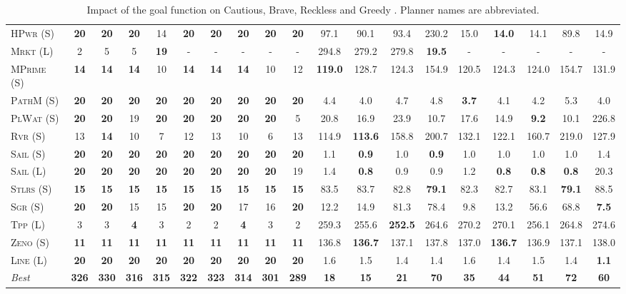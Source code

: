 \begin{table}[tb]
{\begin{tabular}{|l||ccccccccc||ccccccccc||}
\textsc{HPwr} (S)&\textbf{20}&\textbf{20}&\textbf{20}&14&\textbf{20}&\textbf{20}&\textbf{20}&\textbf{20}&\textbf{20}&97.1&90.1&93.4&230.2&15.0&\textbf{14.0}&14.1&89.8&14.9\\
\textsc{Mrkt} (L)&2&5&5&\textbf{19}&-&-&-&-&-&294.8&279.2&279.8&\textbf{19.5}&-&-&-&-&-\\
\textsc{MPrime} (S)&\textbf{14}&\textbf{14}&\textbf{14}&10&\textbf{14}&\textbf{14}&\textbf{14}&10&12&\textbf{119.0}&128.7&124.3&154.9&120.5&124.3&124.0&154.7&131.9\\
\textsc{PathM} (S)&\textbf{20}&\textbf{20}&\textbf{20}&\textbf{20}&\textbf{20}&\textbf{20}&\textbf{20}&\textbf{20}&\textbf{20}&4.4&4.0&4.7&4.8&\textbf{3.7}&4.1&4.2&5.3&4.0\\
\textsc{PlWat} (S)&\textbf{20}&\textbf{20}&19&\textbf{20}&\textbf{20}&\textbf{20}&\textbf{20}&\textbf{20}&5&20.8&16.9&23.9&10.7&17.6&14.9&\textbf{9.2}&10.1&226.8\\
\textsc{Rvr} (S)&13&\textbf{14}&10&7&12&13&10&6&13&114.9&\textbf{113.6}&158.8&200.7&132.1&122.1&160.7&219.0&127.9\\
\textsc{Sail} (S)&\textbf{20}&\textbf{20}&\textbf{20}&\textbf{20}&\textbf{20}&\textbf{20}&\textbf{20}&\textbf{20}&\textbf{20}&1.1&\textbf{0.9}&1.0&\textbf{0.9}&1.0&1.0&1.0&1.0&1.4\\
\textsc{Sail} (L)&\textbf{20}&\textbf{20}&\textbf{20}&\textbf{20}&\textbf{20}&\textbf{20}&\textbf{20}&\textbf{20}&19&1.4&\textbf{0.8}&0.9&0.9&1.2&\textbf{0.8}&\textbf{0.8}&\textbf{0.8}&20.3\\
\textsc{Stlrs} (S)&\textbf{15}&\textbf{15}&\textbf{15}&\textbf{15}&\textbf{15}&\textbf{15}&\textbf{15}&\textbf{15}&\textbf{15}&83.5&83.7&82.8&\textbf{79.1}&82.3&82.7&83.1&\textbf{79.1}&88.5\\
\textsc{Sgr} (S)&\textbf{20}&\textbf{20}&15&15&\textbf{20}&\textbf{20}&17&16&\textbf{20}&12.2&14.9&81.3&78.4&9.8&13.2&56.6&68.8&\textbf{7.5}\\
\textsc{Tpp} (L)&3&3&\textbf{4}&3&2&2&\textbf{4}&3&2&259.3&255.6&\textbf{252.5}&264.6&270.2&270.1&256.1&264.8&274.6\\
\textsc{Zeno} (S)&\textbf{11}&\textbf{11}&\textbf{11}&\textbf{11}&\textbf{11}&\textbf{11}&\textbf{11}&\textbf{11}&\textbf{11}&136.8&\textbf{136.7}&137.1&137.8&137.0&\textbf{136.7}&136.9&137.1&138.0\\
\textsc{Line} (L)&\textbf{20}&\textbf{20}&\textbf{20}&\textbf{20}&\textbf{20}&\textbf{20}&\textbf{20}&\textbf{20}&\textbf{20}&1.6&1.5&1.4&1.4&1.6&1.4&1.5&1.4&\textbf{1.1}
\\\hline
\textit{Best}&\textbf{326}&\textbf{330}&\textbf{316}&\textbf{315}&\textbf{322}&\textbf{323}&\textbf{314}&\textbf{301}&\textbf{289}&\textbf{18}&\textbf{15}&\textbf{21}&\textbf{70}&\textbf{35}&\textbf{44}&\textbf{51}&\textbf{72}&\textbf{60}\\\hline

        \end{tabular}}
        \caption{Impact of the goal function on Cautious, Brave, Reckless and Greedy \pattyd. Planner names are abbreviated.}
        \label{tab:abl-gf}
        \end{table}
        